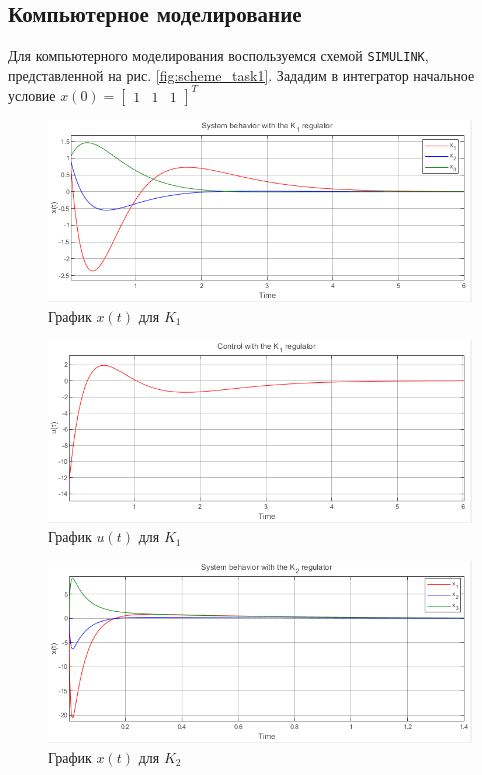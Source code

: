 \documentclass[a4paper, 12pt]{article}
\begin{document}
    \subsection{Компьютерное моделирование}
    Для компьютерного моделирования воспользуемся схемой \texttt{SIMULINK},
    представленной на рис. \ref{fig:scheme_task1}.
    Зададим в интегратор начальное условие $x(0)=\begin{bmatrix}
        1 &1 &1
    \end{bmatrix}^T$
    \begin{figure}[H]
        \centering
        \includegraphics[scale=0.7]{1task_xt_k1.png}
        \captionsetup{skip=0pt}
        \caption{График $x(t)$ для $K_1$}
        \label{fig:1task_xt_k1}
    \end{figure}
    \begin{figure}[H]
        \centering
        \includegraphics[scale=0.7]{1task_ut_k1.png}
        \captionsetup{skip=0pt}
        \caption{График $u(t)$ для $K_1$}
        \label{fig:1task_ut_k1}
    \end{figure}
    \newpage
    \vspace*{5mm}
    \begin{figure}[H]
        \centering
        \includegraphics[scale=0.7]{1task_xt_k2.png}
        \captionsetup{skip=0pt}
        \caption{График $x(t)$ для $K_2$}
        \label{fig:1task_xt_k2}
    \end{figure}
\end{document}
